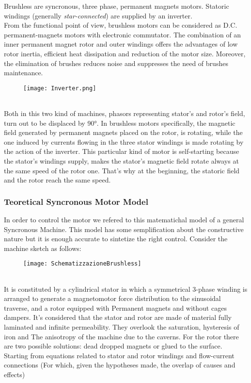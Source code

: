 \documentclass[12pt]{article}
\begin{document}
Brushless are syncronous, three phase, permanent magnets motors.
Statoric windings (generally \textit{star-connected}) are supplied by an inverter.\\
From the functional point of view, brushless motors can be considered as D.C. permanent-magnets motors with electronic commutator.
The combination of an inner permanent magnet rotor and outer windings offers the advantages of low rotor inertia, efficient heat dissipation and reduction of the motor size. Moreover, the elimination of brushes reduces noise and suppresses the need of brushes maintenance.

\begin{figure}[h]
\centering
\texttt{[image: Inverter.png]}
\caption{\label{fig:ciao}}
\end{figure}\\

Both in this two kind of machines, phasors representing stator's and rotor's field, turn out to be displaced by 90°.
In brushless motors specifically, the magnetic field generated by permanent magnets placed on the rotor, is rotating, while the one induced by currents flowing in the three stator windings is made rotating by the action of the inverter.  
This particular kind of motor is self-starting because the stator's windings supply, makes the stator's magnetic field rotate always at the same speed of the rotor one.
That's why at the beginning, the statoric field and the rotor reach the same speed.

\subsubsection*{Teoretical Syncronous Motor Model}

In order to control the motor we refered to this matematichal model of a general Syncronous Machine. This model has some semplification about the constructive nature but it is enough accurate to sintetize the right control.
Consider the machine sketch as follows:

\begin{figure}[h]
	\centering
	\texttt{[image: SchematizzazioneBrushless]}
\end{figure}\\

It is constituted by a cylindrical stator in which a symmetrical 3-phase winding is arranged
to generate a magnetomotor force distribution to the sinusoidal traverse, and a rotor equipped with
Permanent magnets and without cages dampers. It's considered that the stator and rotor are made of material
fully laminated and infinite permeability. They overlook the saturation, hysteresis of iron and
The anisotropy of the machine due to the caverns.
For the rotor there are two possible solutions: dead dropped magnets or glued to the surface.\\
Starting from equations related to stator and rotor windings and flow-current connections
(For which, given the hypotheses made, the overlap of causes and effects)
\end{document}
